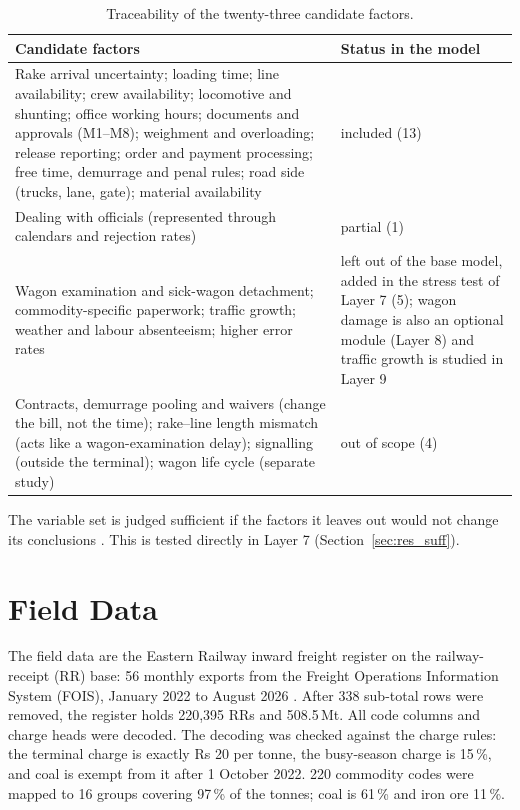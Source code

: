 \begin{table}[!htbp]
\centering
\caption[Traceability of the twenty-three candidate factors]{Traceability of the twenty-three candidate factors.}
\label{tab:factors}
\small
\begin{tabularx}{\textwidth}{@{}X p{5.0cm}@{}}
\toprule
\textbf{Candidate factors} & \textbf{Status in the model} \\
\midrule
Rake arrival uncertainty; loading time; line availability; crew availability; locomotive and shunting; office working hours; documents and approvals (M1--M8); weighment and overloading; release reporting; order and payment processing; free time, demurrage and penal rules; road side (trucks, lane, gate); material availability & included (13) \\
Dealing with officials (represented through calendars and rejection rates) & partial (1) \\
Wagon examination and sick-wagon detachment; commodity-specific paperwork; traffic growth; weather and labour absenteeism; higher error rates & left out of the base model, added in the stress test of Layer 7 (5); wagon damage is also an optional module (Layer 8) and traffic growth is studied in Layer 9 \\
Contracts, demurrage pooling and waivers (change the bill, not the time); rake--line length mismatch (acts like a wagon-examination delay); signalling (outside the terminal); wagon life cycle (separate study) & out of scope (4) \\
\bottomrule
\end{tabularx}
\end{table}

The variable set is judged sufficient if the factors it leaves out would not change its conclusions \cite{robinson, sargent}. This is tested directly in Layer 7 (Section~\ref{sec:res_suff}).

\section{Field Data}
\label{sec:data}
The field data are the Eastern Railway inward freight register on the railway-receipt (RR) base: 56 monthly exports from the Freight Operations Information System (FOIS), January 2022 to August 2026 \cite{errr}. After 338 sub-total rows were removed, the register holds 220,395 RRs and 508.5\,Mt. All code columns and charge heads were decoded. The decoding was checked against the charge rules: the terminal charge is exactly Rs 20 per tonne, the busy-season charge is 15\,\%, and coal is exempt from it after 1 October 2022. 220 commodity codes were mapped to 16 groups covering 97\,\% of the tonnes; coal is 61\,\% and iron ore 11\,\%.

